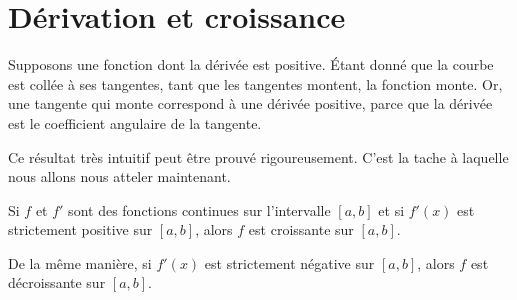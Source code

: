                     \section{Dérivation et croissance}

Supposons une fonction dont la dérivée est positive. Étant donné que la courbe est \og collée \fg{} à ses tangentes, tant que les tangentes montent, la fonction monte. Or, une tangente qui monte correspond à une dérivée positive, parce que la dérivée est le coefficient angulaire de la tangente.


Ce résultat très intuitif peut être prouvé rigoureusement. C'est la tache à laquelle nous allons nous atteler maintenant.

\begin{proposition}
    Si $f$ et $f'$ sont des fonctions continues sur l'intervalle $[a,b]$ et si $f'(x)$ est strictement positive sur $[a,b]$, alors $f$ est croissante sur $[a,b]$.

    De la même manière, si $f'(x)$ est strictement négative sur $[a,b]$, alors $f$ est décroissante sur $[a,b]$.
\end{proposition}

